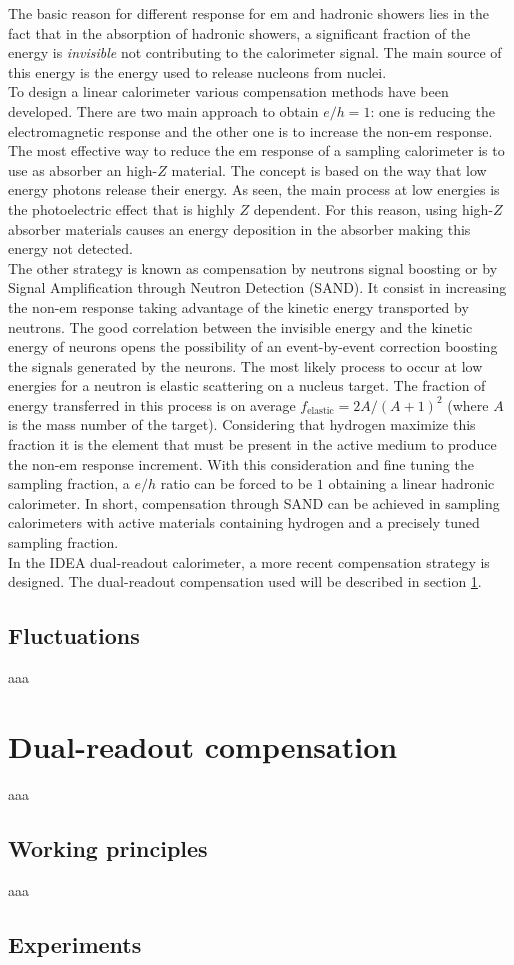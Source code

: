 The basic reason for different response for em and hadronic showers lies in the fact that in the absorption of hadronic showers, a significant fraction of the energy is \textit{invisible} not contributing to the calorimeter signal. The main source of this energy is the energy used to release nucleons from nuclei.\\
To design a linear calorimeter various compensation methods have been developed. There are two main approach to obtain $e/h = 1$: one is reducing the electromagnetic response and the other one is to increase the non-em response.\\
The most effective way to reduce the em response of a sampling calorimeter is to use as absorber an high-$Z$ material. The concept is based on the way that low energy photons release their energy. As seen, the main process at low energies is the photoelectric effect that is highly $Z$ dependent. For this reason, using high-$Z$ absorber materials causes an energy deposition in the absorber making this energy not detected.\\
The other strategy is known as compensation by neutrons signal boosting or by Signal Amplification through Neutron Detection (SAND). It consist in increasing the non-em response taking advantage of the kinetic energy transported by neutrons. The good correlation between the invisible energy and the kinetic energy of neurons opens the possibility of an event-by-event correction boosting the signals generated by the neurons. The most likely process to occur at low energies for a neutron is elastic scattering on a nucleus target. The fraction of energy transferred in this process is on average $f_{\text{elastic}} = 2A / (A +1)^2$ (where $A$ is the mass number of the target). Considering that hydrogen maximize this fraction it is the element that must be present in the active medium to produce the non-em response increment. With this consideration and fine tuning the sampling fraction, a $e/h$ ratio can be forced to be $1$ obtaining a linear hadronic calorimeter.
In short, compensation through SAND can be achieved in sampling calorimeters with active materials containing hydrogen and a precisely tuned sampling fraction.\\
In the IDEA dual-readout calorimeter, a more recent compensation strategy is designed. The dual-readout compensation used will be described in section \ref{sec:DRComp}.

\subsection{Fluctuations}
aaa

\section{Dual-readout compensation}\label{sec:DRComp}
aaa

\subsection{Working principles}
aaa

\subsection{Experiments}